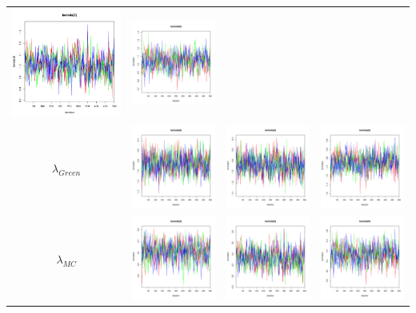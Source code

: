 \documentclass[letter,12pt]{article}
\begin{document}
\begin{table}
\begin{tabular}{cccc}
                        \includegraphics[width=.15\columnwidth]{../graphs/traceplots/2009d0vbar_3.pdf} &
                         \includegraphics[width=.15\columnwidth]{../graphs/traceplots/2009d0wbar_3.pdf} \\
    $\lambda_{Green}$  & \includegraphics[width=.15\columnwidth]{../graphs/traceplots/2009d0v_4.pdf} &
                        \includegraphics[width=.15\columnwidth]{../graphs/traceplots/2009d0vbar_4.pdf} &
                         \includegraphics[width=.15\columnwidth]{../graphs/traceplots/2009d0wbar_4.pdf} \\
    $\lambda_{MC}$    & \includegraphics[width=.15\columnwidth]{../graphs/traceplots/2009d0v_5.pdf} &
                        \includegraphics[width=.15\columnwidth]{../graphs/traceplots/2009d0vbar_5.pdf} &
                         \includegraphics[width=.15\columnwidth]{../graphs/traceplots/2009d0wbar_5.pdf} \\

\end{tabular}
\end{table}
\end{document}
